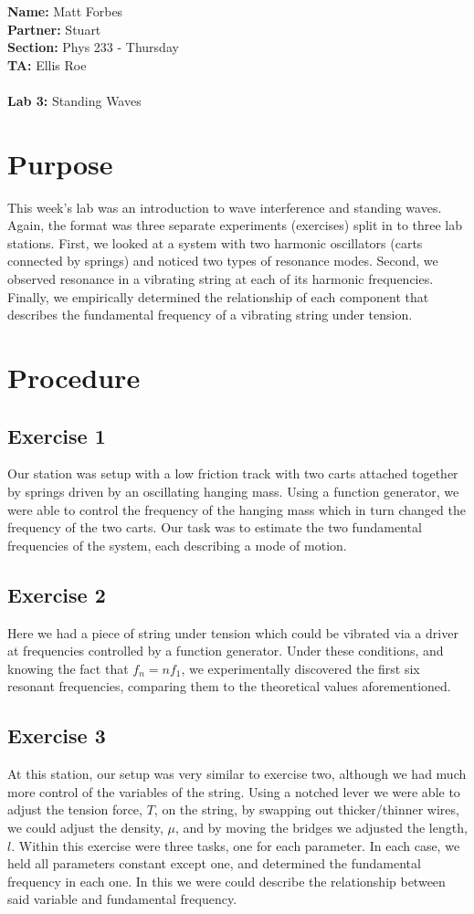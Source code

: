 \documentclass[a4paper,12pt]{article}
\begin{document}
{\bf Name:} Matt Forbes \\
{\bf Partner:} Stuart  \\ 
{\bf Section:} Phys 233 - Thursday \\
{\bf TA:} Ellis Roe  \\ \\ 
{\bf Lab 3:} Standing Waves \\

\section{Purpose}
This week's lab was an introduction to wave interference and standing
waves. Again, the format was three separate experiments (exercises)
split in to three lab stations. First, we looked at a system with two
harmonic oscillators (carts connected by springs) and noticed two
types of resonance modes. Second, we observed resonance in a vibrating
string at each of its harmonic frequencies. Finally, we empirically
determined the relationship of each component that describes the
fundamental frequency of a vibrating string under tension.

\section{Procedure}
\subsection{Exercise 1}
Our station was setup with a low friction track with two carts
attached together by springs driven by an oscillating hanging
mass. Using a function generator, we were able to control the
frequency of the hanging mass which in turn changed the frequency of
the two carts. Our task was to estimate the two fundamental
frequencies of the system, each describing a mode of motion.

\subsection{Exercise 2}
Here we had a piece of string under tension which could be vibrated
via a driver at frequencies controlled by a function generator. Under
these conditions, and knowing the fact that $f_n = nf_1$, we
experimentally discovered the first six resonant frequencies,
comparing them to the theoretical values aforementioned.

\subsection{Exercise 3}
At this station, our setup was very similar to exercise two, although
we had much more control of the variables of the string. Using a
notched lever we were able to adjust the tension force, $T$, on the
string, by swapping out thicker/thinner wires, we could adjust the
density, $\mu$, and by moving the bridges we adjusted the length,
$l$. Within this exercise were three tasks, one for each parameter. In
each case, we held all parameters constant except one, and determined
the fundamental frequency in each one. In this we were could describe
the relationship between said variable and fundamental frequency.
\end{document}
